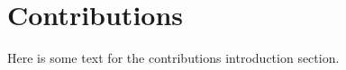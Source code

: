 \section{Contributions}
\label{sec:introduction:contributions}

Here is some text for the contributions introduction section.
